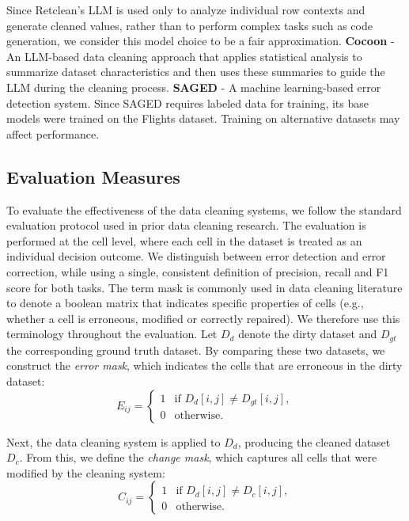 Since Retclean's LLM is used only to analyze individual row contexts and generate cleaned values, rather than to perform complex tasks such as code generation, we consider this model choice to be a fair approximation.
\newline
\textbf{Cocoon} \cite{COCOON} - An LLM-based data cleaning approach that applies statistical analysis to summarize dataset characteristics and then uses these summaries to guide the LLM during the cleaning process.
\newline
\textbf{SAGED} \cite{SAGED} - A machine learning-based error detection system. Since SAGED requires labeled data for training, its base models were trained on the Flights \cite{HOLOCLEAN} dataset. Training on alternative datasets may affect performance.

\subsection{Evaluation Measures}
To evaluate the effectiveness of the data cleaning systems, we follow the standard evaluation protocol used in prior data cleaning research. 
The evaluation is performed at the cell level, where each cell in the dataset is treated as an individual decision outcome. 
We distinguish between error detection and error correction, while using a single, consistent definition of precision, recall and F1 score for both tasks.
\newline\newline
The term mask is commonly used in data cleaning literature to denote a boolean matrix that indicates specific properties of cells (e.g., whether a cell is erroneous, modified or correctly repaired). 
We therefore use this terminology throughout the evaluation.
\newline\newline
Let $D_d$ denote the dirty dataset and $D_{gt}$ the corresponding ground truth dataset.
By comparing these two datasets, we construct the \emph{error mask}, which indicates the cells that are erroneous in the dirty dataset:
\[
E_{ij} =
\begin{cases}
1 & \text{if } D_d[i,j] \neq D_{gt}[i,j], \\
0 & \text{otherwise}.
\end{cases}
\]

Next, the data cleaning system is applied to $D_d$, producing the cleaned dataset $D_c$. 
From this, we define the \emph{change mask}, which captures all cells that were modified by the cleaning system:
\[
C_{ij} =
\begin{cases}
1 & \text{if } D_d[i,j] \neq D_c[i,j], \\
0 & \text{otherwise}.
\end{cases}
\]

